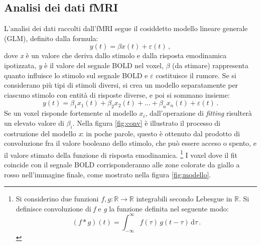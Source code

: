 \documentclass{report}
\newcommand{\figref}[1]{figura \ref{#1}}
\numberwithin{equation}{section}
\numberwithin{figure}{section}
\begin{document}
\subsection{Analisi dei dati fMRI}
L'analisi dei dati raccolti dall'fMRI segue il cosiddetto modello lineare generale (GLM), definito dalla formula:
\begin{equation}
    y(t) = \beta x(t) + \varepsilon(t)\,,
\end{equation}
dove \textit{x} è un valore che deriva dallo stimolo e dalla risposta emodinamica ipotizzata, \textit{y} è il valore del segnale BOLD nel voxel, $\beta$ (da stimare) rappresenta quanto influisce lo stimolo sul segnale BOLD e $\varepsilon$ costituisce il rumore. Se si considerano più tipi di stimoli diversi, si crea un modello separatamente per ciascuno stimolo con entità di risposte diverse, e poi si sommano insieme:
\begin{equation}
    y(t) = \beta_1 x_1(t) + \beta_2 x_2(t) + \ldots + \beta_n x_n(t) + \varepsilon(t)\,.
\end{equation}
Se un voxel risponde fortemente al modello $x_i$, dall'operazione di \textit{fitting} risulterà un elevato valore di $\beta_i$. Nella \figref{fig:conv} è illustrato il processo di costruzione del modello \textit{x}: in poche parole, questo è ottenuto dal prodotto di convoluzione fra il valore booleano dello stimolo, che può essere acceso o spento, e il valore stimato della funzione di risposta emodinamica.%
\footnote{Si considerino due funzioni $f,g:\mathbb{R} \to \mathbb{R}$ integrabili secondo Lebesgue in $\mathbb{R}$. Si definisce convoluzione di \textit{f} e \textit{g} la funzione definita nel seguente modo:
\begin{equation*}
\left( f \ast g \right) (t) = \int_{-\infty}^\infty f(\tau)\,g(t-\tau)\,\mathrm{d}\tau\,.
\end{equation*}}
I voxel dove il fit coincide con il segnale BOLD corrisponderanno alle zone colorate da giallo a rosso nell'immagine finale, come mostrato nella \figref{fig:modello}.
\end{document}
